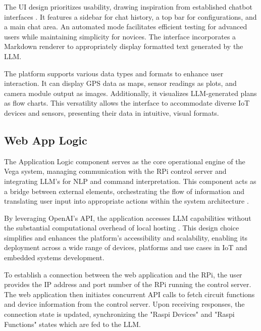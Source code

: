 \documentclass[lettersize,journal]{IEEEtran}
\begin{document}

The UI design prioritizes usability, drawing inspiration from established chatbot interfaces \cite{OpenAI_GPT}. It features a sidebar for chat history, a top bar for configurations, and a main chat area. An automated mode facilitates efficient testing for advanced users while maintaining simplicity for novices. The interface incorporates a Markdown renderer to appropriately display formatted text generated by the LLM.

The platform supports various data types and formats to enhance user interaction. It can display GPS data as maps, sensor readings as plots, and camera module output as images. Additionally, it visualizes LLM-generated plans as flow charts. This versatility allows the interface to accommodate diverse IoT devices and sensors, presenting their data in intuitive, visual formats.

\subsection{Web App Logic}
The Application Logic component serves as the core operational engine of the Vega system, managing communication with the RPi control server and integrating LLM's for NLP and command interpretation. This component acts as a bridge between external elements, orchestrating the flow of information and translating user input into appropriate actions within the system architecture \cite{taylor2010software}.

By leveraging OpenAI's API, the application accesses LLM capabilities without the substantial computational overhead of local hosting \cite{kim2024llmemestimatinggpumemory}. This design choice simplifies and enhances the platform's accessibility and scalability, enabling its deployment across a wide range of devices, platforms and use cases in IoT and embedded systems development.

To establish a connection between the web application and the RPi, the user provides the IP address and port number of the RPi running the control server. The web application then initiates concurrent API calls to fetch circuit functions and device information from the control server. Upon receiving responses, the connection state is updated, synchronizing the "Raspi Devices" and "Raspi Functions" states which are fed to the LLM.
\end{document}
